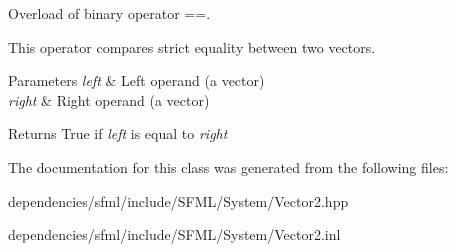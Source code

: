 Overload of binary operator ==. 

This operator compares strict equality between two vectors.


\begin{DoxyParams}{Parameters}
{\em left} & Left operand (a vector) \\
\hline
{\em right} & Right operand (a vector)\\
\hline
\end{DoxyParams}
\begin{DoxyReturn}{Returns}
True if {\itshape left} is equal to {\itshape right} 
\end{DoxyReturn}


The documentation for this class was generated from the following files\+:\begin{DoxyCompactItemize}
\item 
dependencies/sfml/include/\+S\+F\+M\+L/\+System/Vector2.\+hpp\item 
dependencies/sfml/include/\+S\+F\+M\+L/\+System/Vector2.\+inl\end{DoxyCompactItemize}
